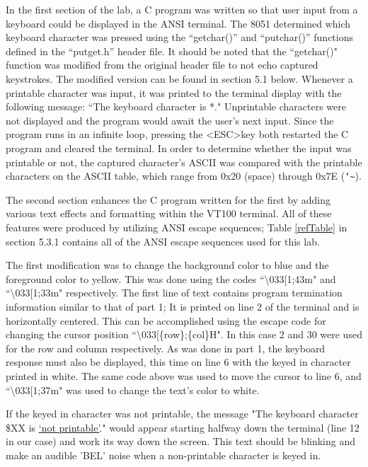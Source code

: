 \documentclass[12pt]{article}
\begin{document}
In the first section of the lab, a C program was written so that user input from a keyboard could be displayed in the ANSI terminal. The 8051 determined which keyboard character was pressed using the ``getchar()'' and ``putchar()'' functions defined in the ``putget.h'' header file. It should be noted that the ``getchar()" function was modified from the original header file to not echo captured keystrokes. The modified version can be found in section 5.1 below. Whenever a printable character was input, it was printed to the terminal display with the following message: ``The keyboard character is *."  Unprintable characters were not displayed and the program would await the user's next input. Since the program runs in an infinite loop, pressing the \textless ESC\textgreater key both restarted the C program and cleared the terminal. In order to determine whether the input was printable or not, the captured character's ASCII was compared with the printable characters on the ASCII table, which range from 0x20 (space) through 0x7E (\texttt{\char`\~}).

The second section enhances the C program written for the first by adding various text effects and formatting within the VT100 terminal. All of these features were produced by utilizing ANSI escape sequences; Table \ref{refTable} in section 5.3.1 contains all of the ANSI escape sequences used for this lab. 

The first modification was to change the background color to blue and the foreground color to yellow. This was done using the codes ``\textbackslash033[1;43m" and ``\textbackslash033[1;33m" respectively. The first line of text contains program termination information similar to that of part 1; It is printed on line 2 of the terminal and is horizontally centered. This can be accomplished using the escape code for changing the cursor position ``\textbackslash033[\{row\};\{col\}H". In this case 2 and 30 were used for the row and column respectively. As was done in part 1, the keyboard response must also be displayed, this time on line 6 with the keyed in character printed in white. The same code above was used to move the cursor to line 6, and ``\textbackslash033[1;37m" was used to change the text's color to white. 

If the keyed in character was not printable, the message "The keyboard character \$XX is \underline{`not printable'}." would appear starting halfway down the terminal (line 12 in our case) and work its way down the screen. This text should be blinking and make an audible 'BEL' noise when a non-printable character is keyed in. 
\end{document}

